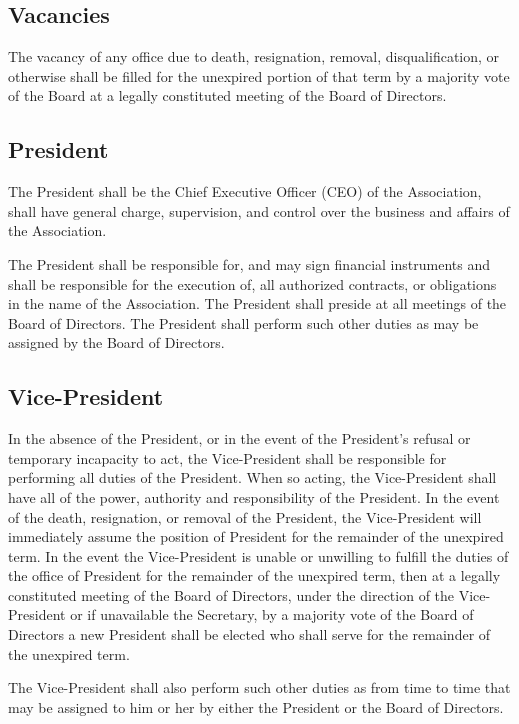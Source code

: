\documentclass[letterpaper,11pt]{article}
\begin{document}
\subsection{Vacancies}
The vacancy of any office due to death, resignation, removal, disqualification, or otherwise shall be filled for the unexpired portion of that term by a majority vote of the Board at a legally constituted meeting of the Board of Directors.
\subsection{President}
The President shall be the Chief Executive Officer (CEO) of the Association, shall have general charge, supervision, and control over the business and affairs of the Association.

The President shall be responsible for, and may sign financial instruments and shall be responsible for the execution of, all authorized contracts, or obligations in the name of the Association. The President shall preside at all meetings of the Board of Directors. The President shall perform such other duties as may be assigned by the Board of Directors.
\subsection{Vice-President}
In the absence of the President, or in the event of the President's refusal or temporary incapacity to act, the Vice-President shall be responsible for performing all duties of the President. When so acting, the Vice-President shall have all of the power, authority and responsibility of the President. In the event of the death, resignation, or removal of the President, the Vice-President will immediately assume the position of President for the remainder of the unexpired term. In the event the Vice-President is unable or unwilling to fulfill the duties of the office of President for the remainder of the unexpired term, then at a legally constituted meeting of the Board of Directors, under the direction of the Vice-President or if unavailable the Secretary, by a majority vote of the Board of Directors a new President shall be elected who shall serve for the remainder of the unexpired term.

The Vice-President shall also perform such other duties as from time to time that may be assigned to him or her by either the President or the Board of Directors.
\end{document}
